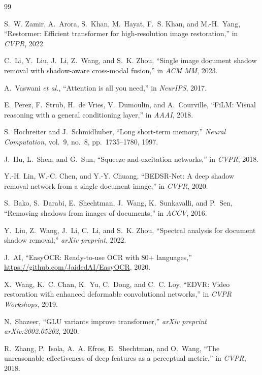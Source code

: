 \documentclass[11pt]{article}
\begin{document}

\begin{thebibliography}{99}

S.~W. Zamir, A.~Arora, S.~Khan, M.~Hayat, F.~S. Khan, and M.-H.~Yang,
``Restormer: Efficient transformer for high-resolution image restoration,''
in \textit{CVPR}, 2022.

C.~Li, Y.~Liu, J.~Li, Z.~Wang, and S.~K. Zhou,
``Single image document shadow removal with shadow-aware cross-modal fusion,''
in \textit{ACM MM}, 2023.

A.~Vaswani \textit{et al.},
``Attention is all you need,''
in \textit{NeurIPS}, 2017.

E.~Perez, F.~Strub, H.~de Vries, V.~Dumoulin, and A.~Courville,
``FiLM: Visual reasoning with a general conditioning layer,''
in \textit{AAAI}, 2018.

S.~Hochreiter and J.~Schmidhuber,
``Long short-term memory,''
\textit{Neural Computation}, vol.~9, no.~8, pp.~1735--1780, 1997.

J.~Hu, L.~Shen, and G.~Sun,
``Squeeze-and-excitation networks,''
in \textit{CVPR}, 2018.

Y.-H. Lin, W.-C. Chen, and Y.-Y. Chuang,
``BEDSR-Net: A deep shadow removal network from a single document image,''
in \textit{CVPR}, 2020.

S.~Bako, S.~Darabi, E.~Shechtman, J.~Wang, K.~Sunkavalli, and P.~Sen,
``Removing shadows from images of documents,''
in \textit{ACCV}, 2016.

Y.~Liu, Z.~Wang, J.~Li, C.~Li, and S.~K. Zhou,
``Spectral analysis for document shadow removal,''
\textit{arXiv preprint}, 2022.

J.~AI, ``EasyOCR: Ready-to-use OCR with 80+ languages,''
\url{https://github.com/JaidedAI/EasyOCR}, 2020.

X.~Wang, K.~C. Chan, K.~Yu, C.~Dong, and C.~C. Loy,
``EDVR: Video restoration with enhanced deformable convolutional networks,''
in \textit{CVPR Workshops}, 2019.

N.~Shazeer,
``GLU variants improve transformer,''
\textit{arXiv preprint arXiv:2002.05202}, 2020.

R.~Zhang, P.~Isola, A.~A. Efros, E.~Shechtman, and O.~Wang,
``The unreasonable effectiveness of deep features as a perceptual metric,''
in \textit{CVPR}, 2018.

\end{thebibliography}
\end{document}
